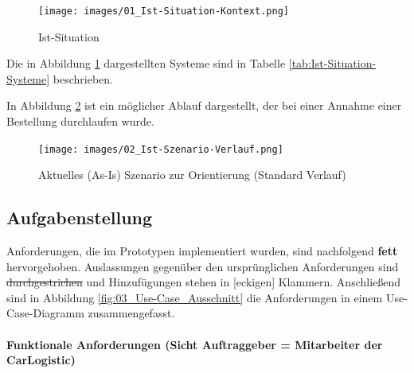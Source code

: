 \begin{figure}
  \centering
  \texttt{[image: images/01\_Ist-Situation-Kontext.png]}
  \caption{Ist-Situation}
  \label{fig:01_Ist-Situation-Kontext}
\end{figure}

Die in Abbildung \ref{fig:01_Ist-Situation-Kontext} dargestellten Systeme sind in Tabelle \ref{tab:Ist-Situation-Systeme} beschrieben.



 In Abbildung \ref{fig:02_Ist-Szenario-Verlauf} ist ein möglicher Ablauf dargestellt, der bei einer Annahme einer Bestellung durchlaufen wurde.

\begin{figure}
  \centering
  \texttt{[image: images/02\_Ist-Szenario-Verlauf.png]}
  \caption{Aktuelles (As-Is) Szenario zur Orientierung (Standard Verlauf)}
  \label{fig:02_Ist-Szenario-Verlauf}
\end{figure}

\subsection{Aufgabenstellung}\label{_aufgabenstellung}

Anforderungen, die im Prototypen implementiert wurden, sind nachfolgend \textbf{fett} hervorgehoben. Auslassungen gegenüber den ursprünglichen Anforderungen sind \sout{durchgestrichen} und Hinzufügungen stehen in [eckigen] Klammern. Anschließend sind in Abbildung \ref{fig:03_Use-Case_Ausschnitt} die Anforderungen in einem Use-Case-Diagramm zusammengefasst.

\paragraph{Funktionale Anforderungen (Sicht Auftraggeber = Mitarbeiter der CarLogistic)}

